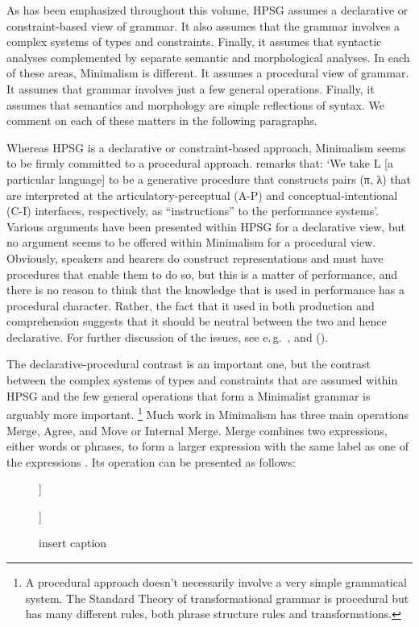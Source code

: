 \documentclass[output=paper]{langsci/langscibook}
\begin{document}
As has been emphasized throughout this volume, HPSG assumes a declarative or constraint-based view of grammar. It also assumes that the grammar involves a complex systems of types and constraints. Finally, it assumes that syntactic analyses complemented by separate semantic and morphological analyses. In each of these areas, Minimalism is different. It assumes a procedural view of grammar. It assumes that grammar involves just a few general operations. Finally, it assumes that semantics and morphology are simple reflections of syntax. We comment on each of these matters in the following paragraphs.

Whereas HPSG is a declarative or constraint-based approach, Minimalism seems to be firmly committed to a procedural approach. \citet[219]{Chomsky95a-u} remarks that: `We take L [a particular language] to be a generative procedure that constructs pairs (π, λ) that are interpreted at the articulatory-perceptual (A-P) and conceptual-intentional (C-I) interfaces, respectively, as ``instructions'' to the performance systems'. Various arguments have been presented within HPSG for a declarative view, but no argument seems to be offered within Minimalism for a procedural view. Obviously, speakers and hearers do construct representations and must have procedures that enable them to do so, but this is a matter of performance, and there is no reason to think that the knowledge that is used in performance has a procedural character. Rather, the fact that it used in both production and comprehension suggests that it should be neutral between the two and hence declarative. For further discussion of the issues, see e.\,g.\ \citet{PS2001a}, \citet{Postal2003a} and \citeauthor{SW2011a} (\citeyear{SW2011a,SW2015a}).

The declarative-procedural contrast is an important one, but the contrast between the complex systems of types and constraints that are assumed within HPSG and the few general operations that form a Minimalist grammar is arguably more important.%
	\footnote{A procedural approach doesn't necessarily involve a very simple grammatical system. The Standard Theory of transformational grammar \citep{Chomsky65a} is procedural but has many different rules, both phrase structure rules and transformations.}
Much work in Minimalism has three main operations Merge, Agree, and Move or Internal Merge. Merge combines two expressions, either words or phrases, to form a larger expression with the same label as one of the expressions \citep[244]{Chomsky95a-u}. Its operation can be presented as follows:
\begin{figure}[h!]
		\centering
	\raisebox{1\baselineskip}{X, Y $\Rightarrow$}
	\hspace{1em}
	\begin{forest}
		[X [X] [Y]]
	\end{forest}
\hspace{1em}
\raisebox{1\baselineskip}{or}
\hspace{1em}
	\begin{forest}
		[Y [X] [Y]]
	\end{forest}
	\caption{\label{fig:min-merge}insert caption}
\end{figure}
\end{document}
